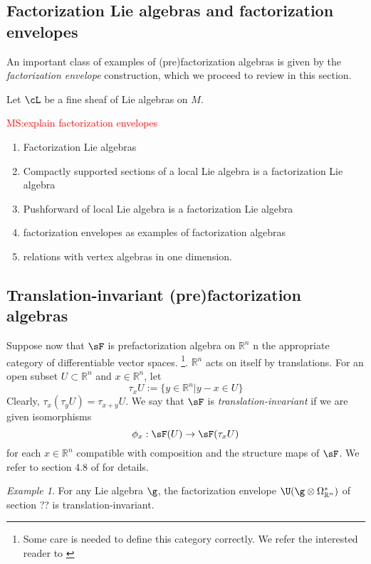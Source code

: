 \documentclass[12pt]{amsart}
\theoremstyle{definition}
\theoremstyle{remark}
\newtheorem{eg}[theorem]{Example}
\def\matt{\textcolor{red}{MS:}\textcolor{red}}
\begin{document}
\subsection{Factorization Lie algebras and factorization envelopes}

An important class of examples of (pre)factorization algebras is given by the \emph{factorization envelope} construction, which we proceed to review in this section.

Let $\cL$ be a fine sheaf of Lie algebras on $M$. 

\matt{explain factorization envelopes}

\begin{enumerate}
\item Factorization Lie algebras
\item Compactly supported sections of a local Lie algebra is a factorization Lie algebra
\item Pushforward of local Lie algebra is a factorization Lie algebra
\item factorization envelopes as examples of factorization algebras
\item relations with vertex algebras in one dimension. 
\end{enumerate}



\subsection{Translation-invariant (pre)factorization algebras}

Suppose now that $\sF$ is prefactorization algebra on $\mathbb{R}^n$ n the appropriate category of
differentiable vector spaces. \footnote{Some care is needed to
  define this category correctly. We refer the interested reader to
  \cite{CG}}. $\mathbb{R}^n$ acts on itself by translations. For an open subset $U \subset \mathbb{R}^n$ and $x \in \mathbb{R}^n$, let 
\[
\tau_x U := \{ y \in \mathbb{R}^n \vert y-x \in U \}
\]
Clearly, $\tau_x (\tau_y U) = \tau_{x+y} U$. We say that $\sF$ is \emph{translation-invariant} if we are given isomorphisms
\[
\phi_x : \sF(U) \rightarrow \sF(\tau_x U)
\]
for each $x \in \mathbb{R}^n$ compatible with composition and the structure maps of $\sF$. We refer to section 4.8 of  \cite{CG} for details. 

\begin{eg}
For any Lie algebra $\g$, the factorization envelope $\U(\g \otimes \Omega^*_{\mathbb{R}^n})$ of section ?? is translation-invariant. 
\end{eg}
\end{document}
